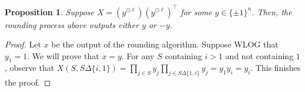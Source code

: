 \documentclass
[11pt,letterpaper]
{article}
\renewcommand{\epsilon}{\varepsilon}
\newtheorem{theorem}{Theorem}[section]
\newtheorem{proposition}[theorem]{Proposition}
\begin{document}
\begin{proposition} \label{prop:rounding-works-even}
Suppose $X = (y^{\odot \ell}) (y^{\odot \ell})^{\top}$ for some $y \in \{\pm 1\}^n$. Then, the rounding process above outputs either $y$ or $-y$. 
\end{proposition}
\begin{proof}
Let $x$ be the output of the rounding algorithm.
Suppose WLOG that $y_1 = 1$. We will prove that $x = y$. 
For any $S$ containing $i>1$ and not containing $1$, observe that $X(S,S \Delta \{i,1\}) = \prod_{j \in S} y_j \prod_{j \in S \Delta \{1,i\}} y_j = y_1 y_i = y_i$. This finishes the proof.
\end{proof}




\end{document}

